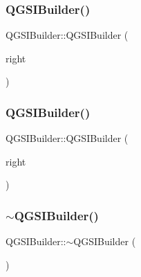 \subsubsection{\texorpdfstring{Q\+G\+S\+I\+Builder()}{QGSIBuilder()}\hspace{0.1cm}{\footnotesize\ttfamily [2/3]}}
{\footnotesize\ttfamily Q\+G\+S\+I\+Builder\+::\+Q\+G\+S\+I\+Builder (\begin{DoxyParamCaption}\item[{const \mbox{\hyperlink{class_q_g_s_i_builder}{Q\+G\+S\+I\+Builder}} \&}]{right }\end{DoxyParamCaption})\hspace{0.3cm}{\ttfamily [delete]}}

\mbox{\label{class_q_g_s_i_builder_a41746b6265af2e362fda407909bb87a3}} 
\subsubsection{\texorpdfstring{Q\+G\+S\+I\+Builder()}{QGSIBuilder()}\hspace{0.1cm}{\footnotesize\ttfamily [3/3]}}
{\footnotesize\ttfamily Q\+G\+S\+I\+Builder\+::\+Q\+G\+S\+I\+Builder (\begin{DoxyParamCaption}\item[{\mbox{\hyperlink{class_q_g_s_i_builder}{Q\+G\+S\+I\+Builder}} \&\&}]{right }\end{DoxyParamCaption})\hspace{0.3cm}{\ttfamily [delete]}}

\mbox{\label{class_q_g_s_i_builder_a3829ba388a3631eacb7c7e463951e188}} 
\subsubsection{\texorpdfstring{$\sim$\+Q\+G\+S\+I\+Builder()}{~QGSIBuilder()}}
{\footnotesize\ttfamily Q\+G\+S\+I\+Builder\+::$\sim$\+Q\+G\+S\+I\+Builder (\begin{DoxyParamCaption}{ }\end{DoxyParamCaption})\hspace{0.3cm}{\ttfamily [virtual]}}



